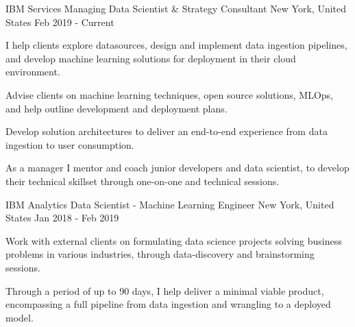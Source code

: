 

\begin{cventries}

  \cventry
    {IBM Services}
    {Managing Data Scientist \& Strategy Consultant} %
    {New York, United States} %
    {Feb 2019 - Current} %
    {
      \begin{cvitems} %
        \item {I help clients explore datasources, design and implement data ingestion pipelines, and develop machine learning solutions for deployment in their cloud environment.}
        \item {Advise clients on machine learning techniques, open source solutions, MLOps, and help outline development and deployment plans.}
        \item {Develop solution architectures to deliver an end-to-end experience from data ingestion to user consumption.}
        \item {As a manager I mentor and coach junior developers and data scientist, to develop their technical skillset through one-on-one and technical sessions.}
      \end{cvitems}
    }

  \cventry
    {IBM Analytics} %
    {Data Scientist - Machine Learning Engineer} %
    {New York, United States} %
    {Jan 2018 - Feb 2019} %
    {
      \begin{cvitems} %
        \item {Work with external clients on formulating data science projects solving business problems in various industries, through data-discovery and brainstorming sessions.}
        \item {Through a period of up to 90 days, I help deliver a minimal viable product, encompassing a full pipeline from data ingestion and wrangling to a deployed model.}
      \end{cvitems}
    }


\end{cventries}
